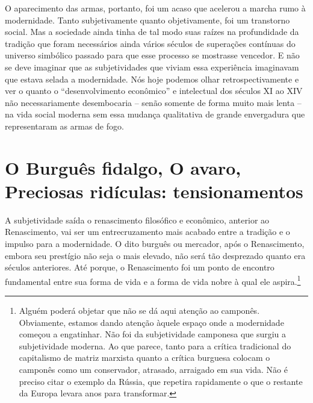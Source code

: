 O aparecimento das armas, portanto, foi um acaso que acelerou a marcha
rumo à modernidade. Tanto subjetivamente quanto objetivamente, foi um
transtorno social. Mas a sociedade ainda tinha de tal modo suas raízes
na profundidade da tradição que foram necessários ainda vários séculos
de superações contínuas do universo simbólico passado para que esse
processo se mostrasse vencedor. E não se deve imaginar que as
subjetividades que viviam essa experiência imaginavam que estava selada
a modernidade. Nós hoje podemos olhar retrospectivamente e ver o quanto
o ``desenvolvimento econômico'' e intelectual dos séculos XI ao XIV não
necessariamente desembocaria -- senão somente de forma muito mais lenta
-- na vida social moderna sem essa mudança qualitativa de grande
envergadura que representaram as armas de fogo.

\section{O Burguês fidalgo, O avaro, Preciosas ridículas: tensionamentos}

A subjetividade saída o renascimento filosófico e econômico, anterior ao
Renascimento, vai ser um entrecruzamento mais acabado entre a tradição e
o impulso para a modernidade. O dito burguês ou mercador, após o
Renascimento, embora seu prestígio não seja o mais elevado, não será tão
desprezado quanto era séculos anteriores. Até porque, o Renascimento foi
um ponto de encontro fundamental entre sua forma de vida e a forma de
vida nobre à qual ele aspira.\footnote{Alguém poderá objetar que não se
  dá aqui atenção ao camponês. Obviamente, estamos dando atenção àquele
  espaço onde a modernidade começou a engatinhar. Não foi da
  subjetividade camponesa que surgiu a subjetividade moderna. Ao que
  parece, tanto para a crítica tradicional do capitalismo de matriz
  marxista quanto a crítica burguesa colocam o camponês como um
  conservador, atrasado, arraigado em sua vida. Não é preciso citar o
  exemplo da Rússia, que repetira rapidamente o que o restante da Europa
  levara anos para transformar.}

